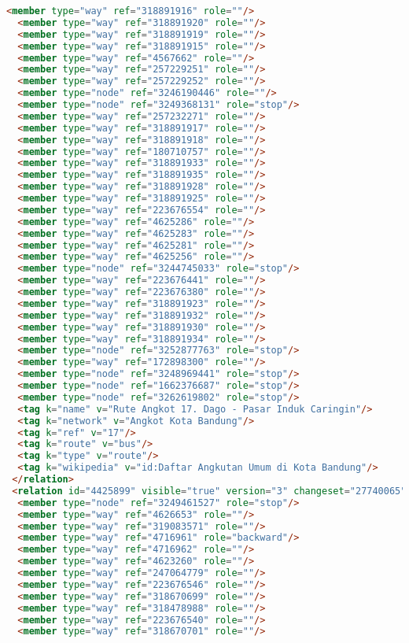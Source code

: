 \begin{lstlisting}[language=HTML,basicstyle=\tiny,caption=test.xml]
  <member type="way" ref="318891916" role=""/>
  <member type="way" ref="318891920" role=""/>
  <member type="way" ref="318891919" role=""/>
  <member type="way" ref="318891915" role=""/>
  <member type="way" ref="4567662" role=""/>
  <member type="way" ref="257229251" role=""/>
  <member type="way" ref="257229252" role=""/>
  <member type="node" ref="3246190446" role=""/>
  <member type="node" ref="3249368131" role="stop"/>
  <member type="way" ref="257232271" role=""/>
  <member type="way" ref="318891917" role=""/>
  <member type="way" ref="318891918" role=""/>
  <member type="way" ref="180710757" role=""/>
  <member type="way" ref="318891933" role=""/>
  <member type="way" ref="318891935" role=""/>
  <member type="way" ref="318891928" role=""/>
  <member type="way" ref="318891925" role=""/>
  <member type="way" ref="223676554" role=""/>
  <member type="way" ref="4625286" role=""/>
  <member type="way" ref="4625283" role=""/>
  <member type="way" ref="4625281" role=""/>
  <member type="way" ref="4625256" role=""/>
  <member type="node" ref="3244745033" role="stop"/>
  <member type="way" ref="223676441" role=""/>
  <member type="way" ref="223676380" role=""/>
  <member type="way" ref="318891923" role=""/>
  <member type="way" ref="318891932" role=""/>
  <member type="way" ref="318891930" role=""/>
  <member type="way" ref="318891934" role=""/>
  <member type="node" ref="3252877763" role="stop"/>
  <member type="way" ref="172898300" role=""/>
  <member type="node" ref="3248969441" role="stop"/>
  <member type="node" ref="1662376687" role="stop"/>
  <member type="node" ref="3262619802" role="stop"/>
  <tag k="name" v="Rute Angkot 17. Dago - Pasar Induk Caringin"/>
  <tag k="network" v="Angkot Kota Bandung"/>
  <tag k="ref" v="17"/>
  <tag k="route" v="bus"/>
  <tag k="type" v="route"/>
  <tag k="wikipedia" v="id:Daftar Angkutan Umum di Kota Bandung"/>
 </relation>
 <relation id="4425899" visible="true" version="3" changeset="27740065" timestamp="2014-12-27T20:46:39Z" user="gnocin" uid="2526082">
  <member type="node" ref="3249461527" role="stop"/>
  <member type="way" ref="4626653" role=""/>
  <member type="way" ref="319083571" role=""/>
  <member type="way" ref="4716961" role="backward"/>
  <member type="way" ref="4716962" role=""/>
  <member type="way" ref="4623260" role=""/>
  <member type="way" ref="247064779" role=""/>
  <member type="way" ref="223676546" role=""/>
  <member type="way" ref="318670699" role=""/>
  <member type="way" ref="318478988" role=""/>
  <member type="way" ref="223676540" role=""/>
  <member type="way" ref="318670701" role=""/>

\end{lstlisting}
